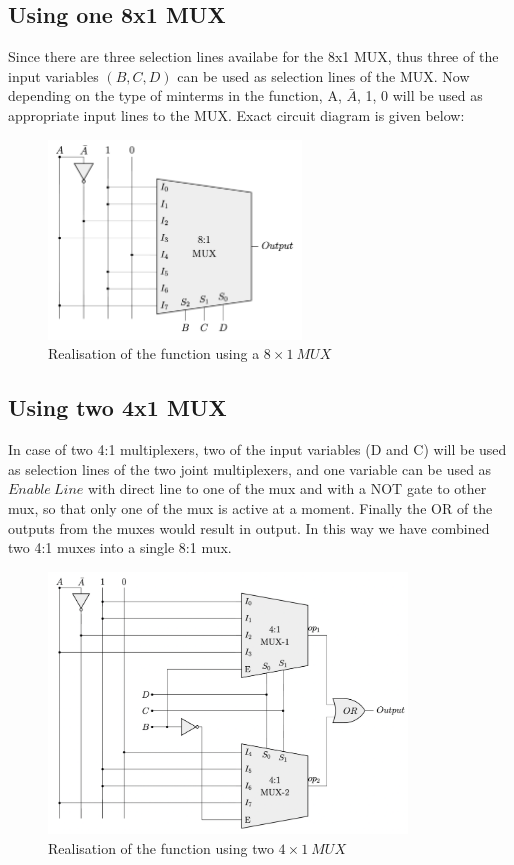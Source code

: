\documentclass[12pt]{article}
\begin{document}
\subsection{Using one 8x1 MUX}
Since there are three selection lines availabe for the 8x1 MUX, thus three of the input variables $(B,C,D)$ can be used as selection lines of the MUX. Now depending on the type of minterms in the function, A, $\bar{A}$, 1, 0 will be used as appropriate input lines to the MUX. Exact circuit diagram is given below:
\begin{figure}[H]
\centering
\includegraphics[width=0.6\textwidth]{8x1.png}
\caption{Realisation of the function using a $8\times1 \ MUX$}
\end{figure}
\subsection{Using two 4x1 MUX}
In case of two 4:1 multiplexers, two of the input variables (D and C) will be used as selection lines of the two joint multiplexers, and one variable can be used as $Enable\ Line$ with direct line to one of the mux and with a NOT gate to other mux, so that only one of the mux is active at a moment. Finally the OR of the outputs from the muxes would result in output. In this way we have combined two 4:1 muxes into a single 8:1 mux.
\begin{figure}[H]
    \centering
    \includegraphics[width=0.85\textwidth,right]{4x1.png}
    \caption{Realisation of the function using two $4\times1 \ MUX$}
    \end{figure}
\end{document}
